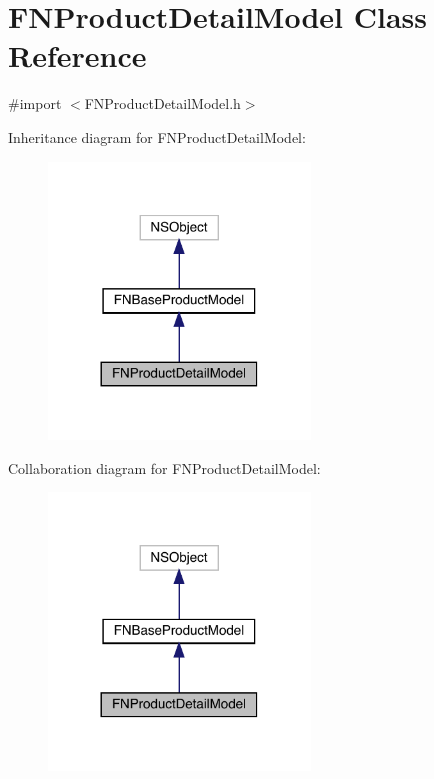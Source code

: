\hypertarget{interface_f_n_product_detail_model}{}\section{F\+N\+Product\+Detail\+Model Class Reference}
\label{interface_f_n_product_detail_model}


{\ttfamily \#import $<$F\+N\+Product\+Detail\+Model.\+h$>$}



Inheritance diagram for F\+N\+Product\+Detail\+Model\+:\nopagebreak
\begin{figure}[H]
\begin{center}
\leavevmode
\includegraphics[width=197pt]{interface_f_n_product_detail_model__inherit__graph}
\end{center}
\end{figure}


Collaboration diagram for F\+N\+Product\+Detail\+Model\+:\nopagebreak
\begin{figure}[H]
\begin{center}
\leavevmode
\includegraphics[width=197pt]{interface_f_n_product_detail_model__coll__graph}
\end{center}
\end{figure}
